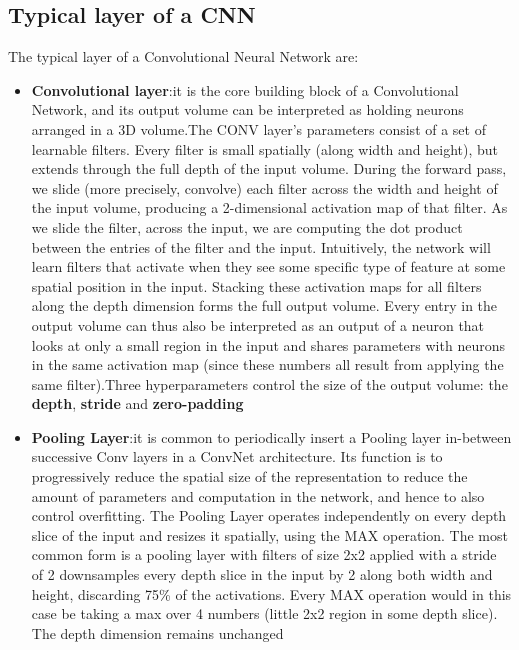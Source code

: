 \documentclass[]{report}
\begin{document}
\subsection{Typical layer of a CNN}

The typical layer of a Convolutional Neural Network are:

\begin{itemize}

\item \textbf{Convolutional layer}:it is the core building block of a Convolutional Network, and its output volume can be interpreted as holding neurons arranged in a 3D volume.The CONV layer's parameters consist of a set of learnable filters. Every filter is small spatially (along width and height), but extends through the full depth of the input volume. During the forward pass, we slide (more precisely, convolve) each filter across the width and height of the input volume, producing a 2-dimensional activation map of that filter. As we slide the filter, across the input, we are computing the dot product between the entries of the filter and the input. Intuitively, the network will learn filters that activate when they see some specific type of feature at some spatial position in the input. Stacking these activation maps for all filters along the depth dimension forms the full output volume. Every entry in the output volume can thus also be interpreted as an output of a neuron that looks at only a small region in the input and shares parameters with neurons in the same activation map (since these numbers all result from applying the same filter).Three hyperparameters control the size of the output volume: the \textbf{depth}, \textbf{stride} and \textbf{zero-padding}

\item \textbf{Pooling Layer}:it is common to periodically insert a Pooling layer in-between successive Conv layers in a ConvNet architecture. Its function is to progressively reduce the spatial size of the representation to reduce the amount of parameters and computation in the network, and hence to also control overfitting. The Pooling Layer operates independently on every depth slice of the input and resizes it spatially, using the MAX operation. The most common form is a pooling layer with filters of size 2x2 applied with a stride of 2 downsamples every depth slice in the input by 2 along both width and height, discarding 75\% of the activations. Every MAX operation would in this case be taking a max over 4 numbers (little 2x2 region in some depth slice). The depth dimension remains unchanged


\end{itemize}
\end{document}
